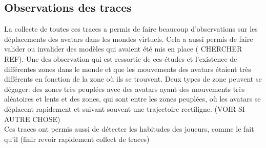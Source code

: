 	\subsection{Observations des traces}
	 La collecte de toutes ces traces a permis de faire beaucoup d'observations sur les déplacements des avatars dans les mondes virtuels. Cela a aussi permis de faire valider ou invalider des modèles qui avaient été mis en place ( CHERCHER REF). Une des observation qui est ressortie de ces études et l'existence de différentes zones dans le monde et que les mouvements des avatars étaient très différents en fonction de la zone où ils se trouvent. Deux types de zone peuvent se dégager: des zones très peuplées avec des avatars ayant des mouvements très aléatoires et lents et des zones, qui sont entre les zones peuplées, où les avatars se déplacent rapidement et suivant souvent une trajectoire rectiligne. (VOIR SI AUTRE CHOSE) \\
	
	Ces traces ont permis aussi de détecter les habitudes des joueurs, comme le fait qu'il (finir revoir rapidement collect de traces)
	
